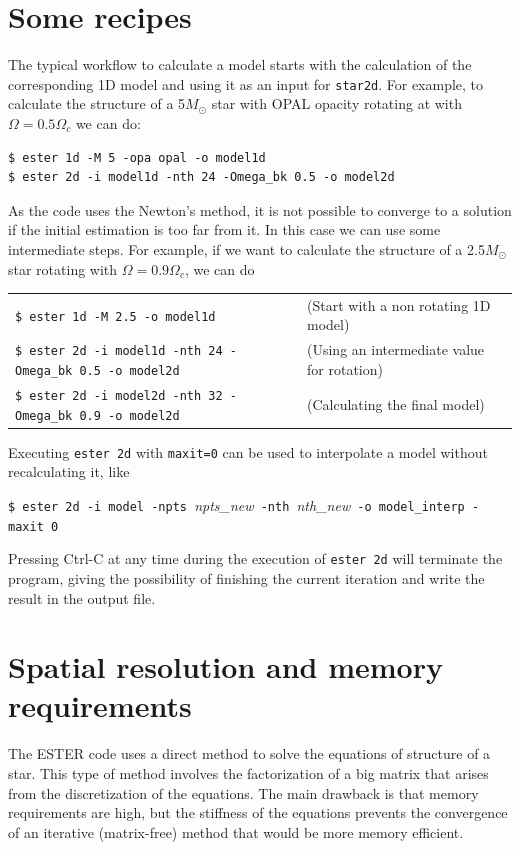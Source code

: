 \section{Some recipes}

The typical workflow to calculate a model starts with the calculation of
the corresponding 1D model and using it as an input for {\tt star2d}. For
example, to calculate the structure of a 5$M_\odot$ star with OPAL
opacity rotating at with $\Omega=0.5\Omega_c$ we can do:

\begin{verbatim}
$ ester 1d -M 5 -opa opal -o model1d
$ ester 2d -i model1d -nth 24 -Omega_bk 0.5 -o model2d
\end{verbatim}

As the code uses the Newton's method, it is not possible
to converge to a solution if the initial estimation is too far from
it. In this case we can use some intermediate steps.  For example, if
we want to calculate the structure of a 2.5$M_\odot$ star rotating with
$\Omega=0.9\Omega_c$, we can do

\medskip
\noindent\begin{tabular}{lp{4.5cm}}
\verb|$ ester 1d -M 2.5 -o model1d |  
&(Start with a non rotating 1D model)\\
\verb|$ ester 2d -i model1d -nth 24 -Omega_bk 0.5 -o model2d| &	
(Using an intermediate value for rotation) \\
\verb|$ ester 2d -i model2d -nth 32 -Omega_bk 0.9 -o model2d| &	
(Calculating the final model) 
\end{tabular}
\medskip

Executing {\tt ester 2d} with {\tt maxit=0} can be used to interpolate a
model without recalculating it, like

\medskip
\noindent
\verb|$ ester 2d -i model -npts |{\it npts\_new}\verb| -nth |{\it nth\_new}\verb| -o model_interp -maxit 0|

\medskip
Pressing Ctrl-C at any time during the execution of {\tt ester 2d} will
terminate the program, giving the possibility of finishing the current
iteration and write the result in the output file.

\section{Spatial resolution and memory requirements}

The ESTER code uses a direct method to solve the equations of structure
of a star. This type of method involves the factorization of a big matrix
that arises from the discretization of the equations.  The main drawback
is that memory requirements are high, but the stiffness of the equations
prevents the convergence of an iterative (matrix-free) method that would
be more memory efficient.

